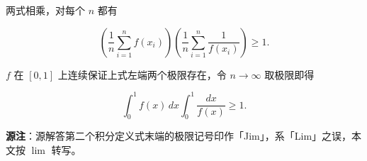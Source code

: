 \begin{answer}
两式相乘，对每个 $n$ 都有

\nopagebreak[4]
\[
\left(\frac1n\sum_{i=1}^{n}f(x_i)\right)
\left(\frac1n\sum_{i=1}^{n}\frac1{f(x_i)}\right)
\ge 1.
\]

$f$ 在 $[0,1]$ 上连续保证上式左端两个极限存在，令 $n\to\infty$ 取极限即得

\nopagebreak[4]
\[
\int_0^1 f(x)\,dx\int_0^1\frac{dx}{f(x)}\ge 1.
\]

\begin{gktip}
\textbf{源注}：源解答第二个积分定义式末端的极限记号印作「Jim」，系「Lim」之误，本文按 $\lim$ 转写。
\end{gktip}



\end{answer}